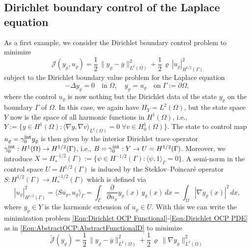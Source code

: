 \documentclass{article}
\numberwithin{equation}{section}
\begin{document}
\subsection{Dirichlet boundary control of the Laplace equation}
%
As a first example, we consider the Dirichlet boundary control problem
to minimize
\begin{equation}\label{Eqn:Dirichlet OCP Functional}
  {\mathcal{J}}(y_\varrho,u_\varrho) =
  \frac{1}{2} \, \| y_\varrho - \overline{y} \|^2_{L^2(\Omega)} +
  \frac{1}{2} \, \varrho \, | u_\varrho |^2_{H^{1/2}(\Gamma)}
\end{equation}
subject to the Dirichlet boundary value problem for the Laplace
equation
\begin{equation}\label{Eqn:Dirichlet OCP PDE}
  - \Delta y_\varrho = 0 \quad \mbox{in} \; \Omega, \quad
  y_\varrho = u_\varrho \quad \mbox{on} \; \Gamma := \partial \Omega,
\end{equation}
where the control $u_\varrho$ is now nothing but the Dirichlet data of the
state $y_\varrho$ on the boundary $\Gamma$ of $\Omega$. In this case, we
again have $H_Y = L^2(\Omega)$, but the state space $Y$ now is the
space of all harmonic functions in $H^1(\Omega)$, i.e.,
$Y := \{ y \in H^1(\Omega) :
\langle \nabla y , \nabla v \rangle_{L^2(\Omega)} = 0 \; \forall
v \in H^1_0(\Omega)\}$. The state to control map
$u_\varrho = \gamma_0^{\mbox{\footnotesize int}}y_\varrho$ is then given by
the interior Dirichlet trace operator
$\gamma_0^{\mbox{\footnotesize int}} : H^1(\Omega) \to H^{1/2}(\Gamma)$,
i.e.,
$ B = \gamma_0^{\mbox{\footnotesize int}} : Y \to U = H^{1/2}(\Gamma)$.
Moreover, we introduce
$X = H_*^{-1/2}(\Gamma) := \{ \psi \in H^{-1/2}(\Gamma) :
\langle \psi , 1 \rangle_\Gamma = 0\}$.
A semi-norm in the control space $U = H^{1/2}(\Gamma)$
is induced by the Steklov--Poincar\'e operator
$S : H^{1/2}(\Gamma) \to H^{-1/2}_*(\Gamma)$ which is defined via
\[
  |u_\varrho|_{H^{1/2}(\Gamma)}^2 = \langle S u_\varrho , u_\varrho \rangle_\Gamma =
  \int_\Gamma \frac{\partial}{\partial n_x}y_\varrho(x) \, y_\varrho(x) \, dx =
  \int_\Omega |\nabla y_\varrho(x)|^2 \, dx,
\]
where $y_\varrho \in Y$ is the harmonic extension of $u_\varrho \in U$.
With this we can write the minimization problem
\eqref{Eqn:Dirichlet OCP Functional}-\eqref{Eqn:Dirichlet OCP PDE}
as in \eqref{Eqn:AbstractOCP:AbstractFunctionalD} to minimize
\begin{equation}\label{Eqn:Dirichlet OCP reduced Functional}
  \check{\mathcal{J}}(y_\varrho) =
  \frac{1}{2} \, \| y_\varrho - \overline{y} \|^2_{L^2(\Omega)} +
  \frac{1}{2} \, \varrho \, \| \nabla y_\varrho \|^2_{L^2(\Omega)}
\end{equation}
\end{document}
